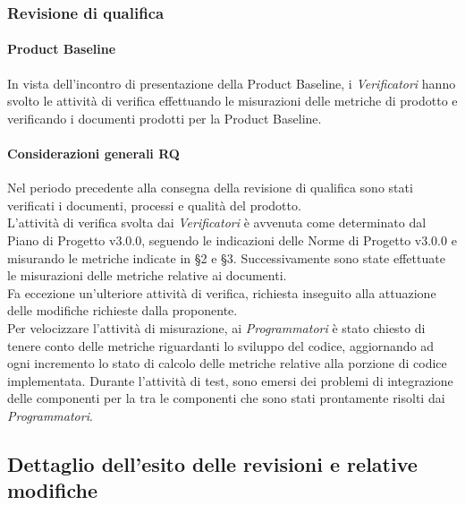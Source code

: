 	\subsubsection{Revisione di qualifica}
	\paragraph{Product Baseline}
	In vista dell'incontro di presentazione della Product Baseline, i \textit{Verificatori} hanno svolto le attività di verifica effettuando le misurazioni delle metriche di prodotto e verificando i documenti prodotti per la Product Baseline.
	
			
	\paragraph{Considerazioni generali RQ}
	Nel periodo precedente alla consegna della revisione di qualifica sono stati verificati i documenti, processi e qualità del prodotto. \\
	L'attività di verifica svolta dai \textit{Verificatori} è avvenuta come determinato dal Piano di Progetto v3.0.0, seguendo le indicazioni delle Norme di Progetto v3.0.0 e misurando le metriche indicate in §2 e §3.  Successivamente sono state effettuate le misurazioni delle metriche relative ai documenti. \\
	Fa eccezione un'ulteriore attività di verifica, richiesta inseguito alla attuazione delle modifiche richieste dalla proponente. \\
	Per velocizzare l'attività di misurazione, ai \textit{Programmatori} è stato chiesto di tenere conto delle metriche riguardanti lo sviluppo del codice, aggiornando ad ogni incremento lo stato di calcolo delle metriche relative alla porzione di codice implementata.
	Durante l'attività di test, sono emersi dei problemi di integrazione delle componenti per la tra le componenti che sono stati prontamente risolti dai \textit{Programmatori}. 
	\newpage
\subsection{Dettaglio dell'esito delle revisioni e relative modifiche}
